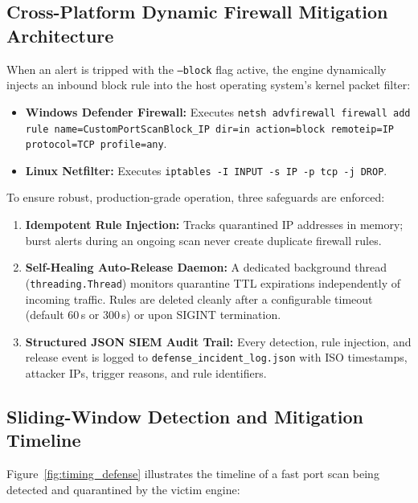 \subsection{Cross-Platform Dynamic Firewall Mitigation Architecture}
When an alert is tripped with the \texttt{--block} flag active, the engine dynamically injects an
inbound block rule into the host operating system's kernel packet filter:
\begin{itemize}
    \item \textbf{Windows Defender Firewall:} Executes \texttt{netsh advfirewall firewall add rule name=CustomPortScanBlock\_IP dir=in action=block remoteip=IP protocol=TCP profile=any}.
    \item \textbf{Linux Netfilter:} Executes \texttt{iptables -I INPUT -s IP -p tcp -j DROP}.
\end{itemize}
To ensure robust, production-grade operation, three safeguards are enforced:
\begin{enumerate}
    \item \textbf{Idempotent Rule Injection:} Tracks quarantined IP addresses in memory; burst alerts
    during an ongoing scan never create duplicate firewall rules.
    \item \textbf{Self-Healing Auto-Release Daemon:} A dedicated background thread (\texttt{threading.Thread})
    monitors quarantine TTL expirations independently of incoming traffic. Rules are deleted cleanly
    after a configurable timeout (default 60\,s or 300\,s) or upon SIGINT termination.
    \item \textbf{Structured JSON SIEM Audit Trail:} Every detection, rule injection, and release event
    is logged to \texttt{defense\_incident\_log.json} with ISO timestamps, attacker IPs, trigger
    reasons, and rule identifiers.
\end{enumerate}

\subsection{Sliding-Window Detection and Mitigation Timeline}
Figure~\ref{fig:timing_defense} illustrates the timeline of a fast port scan being detected and
quarantined by the victim engine:

